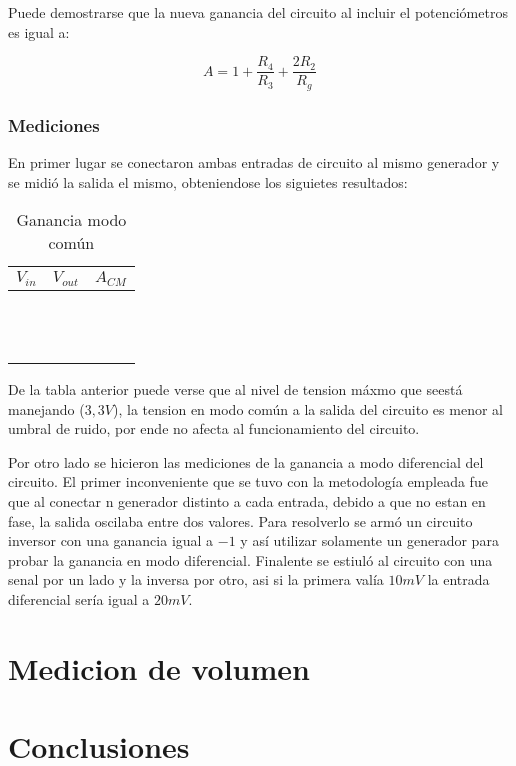 \documentclass[a4paper]{article}
\begin{document}
Puede demostrarse que la nueva ganancia del circuito al incluir el potenciómetros es igual a:


\begin{equation}
\boxed{A = 1 + \frac{R_4}{R_3} + \frac{2R_2}{R_g}}
\end{equation}



\subsubsection{Mediciones}

En primer lugar se conectaron ambas entradas de circuito al mismo generador y se midi\'o la salida el mismo, obteniendose los siguietes resultados:


\begin{table}[H]
\hspace*{-2cm} 
\begin{tabular}{c c c}
\hline
$V_{in}$ & $V_{out}$ & $A_{CM}$ \\ \hline
&& \\ \hline
&& \\ \hline\\
&& \\ \hline\\
&& \\ \hline\\
&& \\ \hline\\
&& \\ \hline\\
&& \\ \hline
\end{tabular}
\caption{Ganancia modo com\'un}
\label{tabla:ganancia_comun}
\end{table}


De la tabla anterior puede verse que al nivel de tension m\'axmo que seest\'a manejando ($3,3V$), la tension en modo com\'un a la salida del circuito es menor al umbral de ruido, por ende no afecta al funcionamiento del circuito. 



Por otro lado se hicieron las mediciones de la ganancia a modo diferencial del circuito. El primer inconveniente que se tuvo con la metodolog\'ia empleada fue que al conectar n generador distinto a cada entrada, debido a que no estan en fase, la salida oscilaba entre dos valores. Para resolverlo se arm\'o un circuito inversor con una ganancia igual a $-1$ y as\'i utilizar solamente un generador para probar la ganancia en modo diferencial. Finalente se estiul\'o al circuito con una senal por un lado y la inversa por otro, asi si la primera val\'ia $10mV$ la entrada diferencial ser\'ia igual a $20mV$.





\section{Medicion de volumen}

\section{Conclusiones}
\end{document}
